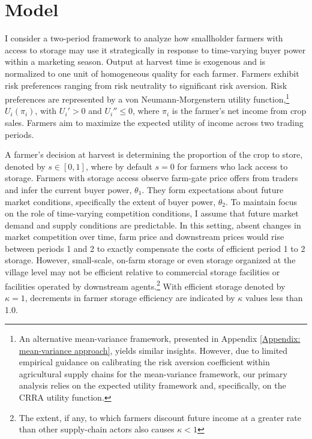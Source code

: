 \section{Model}
\noindent
I consider a two-period framework to analyze how smallholder farmers with access to storage may use it strategically in response to time-varying buyer power within a marketing season. Output at harvest time is exogenous and is normalized to one unit of homogeneous quality for each farmer. Farmers exhibit risk preferences ranging from risk neutrality to significant risk aversion. Risk preferences are represented by a von Neumann-Morgenstern utility function,\footnote{An alternative mean-variance framework, presented in Appendix \ref{Appendix: mean-variance approach}, yields similar insights. However, due to limited empirical guidance on calibrating the risk aversion coefficient within agricultural supply chains for the mean-variance framework, our primary analysis relies on the expected utility framework and, specifically, on the CRRA utility function.} $U_i(\pi_i)$, with $U_i' > 0$ and $U_i'' \leq 0$, where $\pi_i$ is the farmer's net income from crop sales. Farmers aim to maximize the expected utility of income across two trading periods.

A farmer's decision at harvest is determining the proportion of the crop to store, denoted by $s \in [0,1]$, where by default $s=0$ for farmers who lack access to storage. Farmers with storage access observe farm-gate price offers from traders and infer the current buyer power, $\theta_1$. They form expectations about future market conditions, specifically the extent of buyer power, $\theta_2$. To maintain focus on the role of time-varying competition conditions, I assume that future market demand and supply conditions are predictable. In this setting, absent changes in market competition over time, farm price and downstream prices would rise between periods 1 and 2 to exactly compensate the costs of efficient period 1 to 2 storage. However, small-scale, on-farm storage or even storage organized at the village level may not be efficient relative to commercial storage facilities or facilities operated by downstream agents.\footnote{The extent, if any, to which farmers discount future income at a greater rate than other supply-chain actors also causes $\kappa <1$} With efficient storage denoted by $\kappa = 1$, decrements in farmer storage efficiency are indicated by $\kappa$ values less than 1.0.

